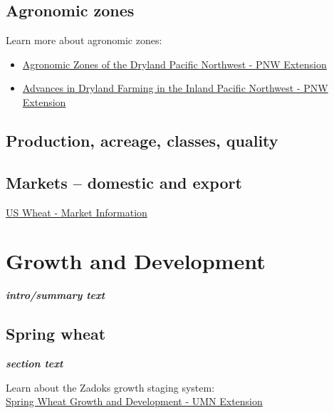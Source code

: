 \documentclass[
  letterpaper,
  DIV=11,
  numbers=noendperiod]{scrreprt}
\providecommand{\tightlist}{%
  \setlength{\itemsep}{0pt}\setlength{\parskip}{0pt}}\usepackage{longtable,booktabs,array}
\begin{document}
\section{Agronomic zones}\label{agronomic-zones}

Learn more about agronomic zones:

\begin{itemize}
\tightlist
\item
  \href{https://extension.oregonstate.edu/sites/extd8/files/documents/pnw354.pdf}{Agronomic
  Zones of the Dryland Pacific Northwest - PNW Extension}\\
\item
  \href{https://pubs.extension.wsu.edu/product/advances-in-dryland-farming-in-the-inland-pacific-northwest-pnw697-reacch-handbook/}{Advances
  in Dryland Farming in the Inland Pacific Northwest - PNW Extension}\\
\end{itemize}

\section{Production, acreage, classes,
quality}\label{production-acreage-classes-quality}

\section{Markets -- domestic and
export}\label{markets-domestic-and-export}

\href{https://www.uswheat.org/market-information/}{US Wheat - Market
Information}


\chapter{Growth and Development}\label{growth-and-development}

\textbf{\emph{intro/summary text}}

\section{Spring wheat}\label{spring-wheat}

\textbf{\emph{section text}}

Learn about the Zadoks growth staging system:\\
\href{https://extension.umn.edu/growing-small-grains/spring-wheat-growth-and-development-guide}{Spring
Wheat Growth and Development - UMN Extension}
\end{document}
